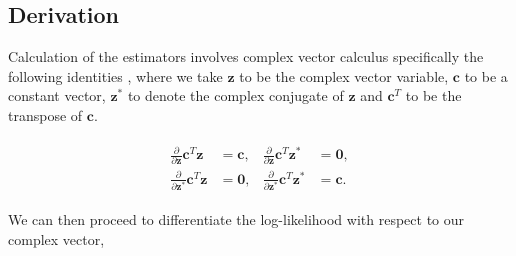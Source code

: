 \documentclass[honours,12pt]{unswthesis}
\numberwithin{equation}{section}
\begin{document}
\subsection{Derivation}

\indent Calculation of the estimators involves complex vector calculus specifically the following identities \cite{fischer2002}, where we take $\mathbf{z}$ to be the complex vector variable, $\mathbf{c}$ to be a constant vector, $\mathbf{z}^{*}$ to denote the complex conjugate of $\mathbf{z}$ and $\mathbf{c}^{T}$ to be the transpose of $\mathbf{c}$.

\begin{align}\label{complexvectorcalculus}
	\begin{split}
		\frac{\partial}{\partial \mathbf{z}}\mathbf{c}^{T}\mathbf{z} &= \mathbf{c},\\
		\frac{\partial}{\partial \mathbf{z}^{*}}\mathbf{c}^{T}\mathbf{z} &= \mathbf{0},
	\end{split}
	\begin{split}
		 \frac{\partial}{\partial \mathbf{z}} \mathbf{c}^{T}\mathbf{z}^{*}&=\mathbf{0},\\
		 \frac{\partial}{\partial \mathbf{z}^{*}} \mathbf{c}^{T}\mathbf{z}^{*}&=\mathbf{c}.
	\end{split}
\end{align}

\noindent We can then proceed to differentiate the log-likelihood with respect to our complex vector,
\end{document}
